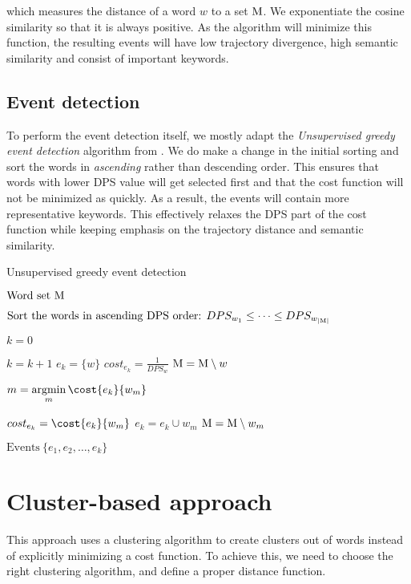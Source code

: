 which measures the  distance of a word $w$ to a set $\text{M}$. We exponentiate the cosine similarity so that it is always positive. As the algorithm will minimize this function, the resulting events will have low trajectory divergence, high semantic similarity and consist of important keywords.


\subsection{Event detection}
To perform the event detection itself, we mostly adapt the \textit{Unsupervised greedy event detection} algorithm from \cite{event-detection}. We do make a change in the initial sorting and sort the words in \textit{ascending} rather than descending order. This ensures that words with lower DPS value will get selected first and that the cost function will not be minimized as quickly. As a result, the events will contain more representative keywords. This effectively relaxes the DPS part of the cost function while keeping emphasis on the trajectory distance and semantic similarity.

\begin{algorithm}[H] \label{alg:greedy-event-detection}
\begin{algorithmic}[1]
\caption{Unsupervised greedy event detection}
\Input $\text{Word set} ~ \text{M}$

\State $\text{Sort the words in ascending DPS order: } DPS_{w_{1}} \leq \dots \leq DPS_{w_{\left\vert \text{M} \right\vert}}$

\State $k = 0$

	\State $k = k + 1$	
	\State $e_{k} = \{ w \}$
	\State $cost_{e_{k}} = \frac{1}{DPS_{w}}$
	\State $\text{M} = \text{M} \setminus w$
	
	\While{$\featset \neq \emptyset$}
		\State $m = \argmin\limits_{m}{\cost{e_{k}}{w_{m}}}$

			\State $cost_{e_{k}} = \cost{e_{k}}{w_{m}}$
			\State $e_{k} = e_{k} \cup w_{m}$
			\State $\text{M} = \text{M} \setminus w_{m}$
		\Else
			\Break
		\EndIf
	\EndWhile
\EndFor

\Output $\text{Events} ~ \{ e_{1}, e_{2}, \dots, e_{k} \}$
\end{algorithmic}
\end{algorithm}


\section{Cluster-based approach}
This approach uses a clustering algorithm to create clusters out of words instead of explicitly minimizing a cost function. To achieve this, we need to choose the right clustering algorithm, and define a proper distance function.

